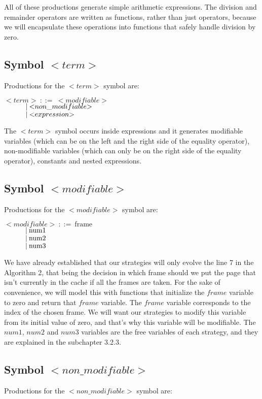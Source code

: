 All of these productions generate simple arithmetic expressions. The division and remainder operators are written as functions, rather than just operators, because we will encapsulate these operations into functions that safely handle division by zero.

\subsection{Symbol ${<}term{>}$}
Productions for the ${<}term{>}$ symbol are:

\noindent
$ {<}term{>}\:::=\:{<}modifiable{>} $\\
$ \indent\indent |\:{<}non\_modifiable{>} $\\
$ \indent\indent |\:{<}expression{>} $

The ${<}term{>}$ symbol occurs inside expressions and it generates modifiable variables (which can be on the left and the right side of the equality operator), non-modifiable variables (which can only be on the right side of the equality operator), constants and nested expressions.

\subsection{Symbol ${<}modifiable{>}$}
Productions for the ${<}modifiable{>}$ symbol are:

\noindent
$ {<}modifiable{>}\:::=\:\text{frame} $\\
$ \indent\indent |\:\text{num1} $\\
$ \indent\indent |\:\text{num2} $\\
$ \indent\indent |\:\text{num3} $

We have already established that our strategies will only evolve the line 7 in the Algorithm 2, that being the decision in which frame should we put the page that isn't currently in the cache if all the frames are taken. For the sake of convenience, we will model this with functions that initialize the $frame$ variable to zero and return that $frame$ variable. The $frame$ variable corresponds to the index of the chosen frame. We will want our strategies to modify this variable from its initial value of zero, and that's why this variable will be modifiable. The $num1$, $num2$ and $num3$ variables are the free variables of each strategy, and they are explained in the subchapter 3.2.3.

\subsection{Symbol ${<}non\_modifiable{>}$}
Productions for the ${<}non\_modifiable{>}$ symbol are:

